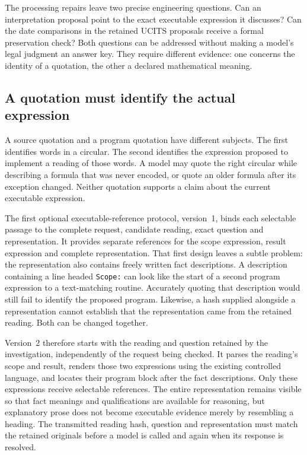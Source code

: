 \documentclass[12pt,a4paper,oneside,openany]{book}
\begin{document}
The processing repairs leave two precise engineering questions. Can an
interpretation proposal point to the exact executable expression it discusses?
Can the date comparisons in the retained UCITS proposals receive a formal
preservation check? Both questions can be addressed without making a model's
legal judgment an answer key. They require different evidence: one concerns
the identity of a quotation, the other a declared mathematical meaning.

\subsection{A quotation must identify the actual expression}

A source quotation and a program quotation have different subjects. The first
identifies words in a circular. The second identifies the expression proposed
to implement a reading of those words. A model may quote the right circular
while describing a formula that was never encoded, or quote an older formula
after its exception changed. Neither quotation supports a claim about the
current executable expression.

The first optional executable-reference protocol, version~1, binds each
selectable passage to the complete request, candidate reading, exact question
and representation. It provides separate references for the scope expression,
result expression and complete representation. That first design leaves a
subtle problem: the representation also contains freely written fact
descriptions. A description containing a line headed \texttt{Scope:} can look
like the start of a second program expression to a text-matching routine.
Accurately quoting that description would still fail to identify the proposed
program. Likewise, a hash supplied alongside a representation cannot establish
that the representation came from the retained reading. Both can be changed
together.

Version~2 therefore starts with the reading and question retained by the
investigation, independently of the request being checked. It parses the
reading's scope and result, renders those two expressions using the existing
controlled language, and locates their program block after the fact
descriptions. Only these expressions receive selectable references. The entire
representation remains visible so that fact meanings and qualifications are
available for reasoning, but explanatory prose does not become executable
evidence merely by resembling a heading. The transmitted reading hash,
question and representation must match the retained originals before a model
is called and again when its response is resolved.
\end{document}
